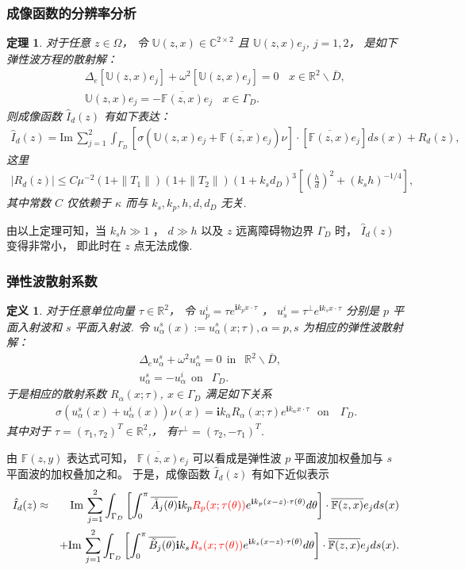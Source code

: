 \documentclass[8pt]{beamer}
\newcommand{\R}{\mathbb{R}}
\renewcommand{\i}{\mathbf{i}}
\renewcommand{\Im}{\mathrm{Im}\,}
\newtheorem{them}{定理}[section]
\newtheorem{deff}{定义}[section]
\newcommand{\om}{\omega}
\newcommand{\al}{\alpha}
\newcommand{\Ga}{\Gamma}
\newcommand{\De}{\Delta}
\newcommand{\bks}{\backslash}
\renewcommand{\i}{\mathbf{i}}
\renewcommand{\C}{{\mathbb{C}}}
\renewcommand{\Im}{\mathrm{Im}\,}
\newcommand{\F}{\mathbb{F}}
\renewcommand{\U}{\mathbb{U}}
\newcommand{\ben}{\begin{eqnarray*}}
\newcommand{\een}{\end{eqnarray*}}
\begin{document}
\begin{frame}
\frametitle{成像函数的分辨率分析}
\begin{them}\label{thm:4.3}
	对于任意 $z\in\Omega$， 令 $\U(z,x)\in\C^{2\times2}$ 且 $\U(z,x)e_j$, $j=1,2$， 是如下弹性波方程的散射解：
	\ben
	& &\Delta_e [\U(z,x)e_j]+ \omega^2[\U(z,x)e_j]= 0 \ \  \ \ x\in\R^2\bks \bar{D},  \\
	& &
	\U(z,x)e_j= -\overline{\F(z,x)}e_j \ \  \ \ x\in\Ga_D.  
	\een
	则成像函数 $\hat{I}_d(z)$ 有如下表达：
	\ben
	\hat{I}_d(z)=\Im\sum_{j=1}^2\int_{\Gamma_D}[\sigma(\U(z,x)e_j+\overline{\F(z,x)}e_j)\nu]\cdot [\overline{\F(z,x)}e_j]ds(x)+R_d(z),\label{id}
	\een
	这里 
	\ben
	|R_d(z)|\leq C\mu^{-2}(1+\|T_1\|)(1+\|T_2\|)(1+k_s d_D)^3\left[\left(\frac hd\right)^{2}+(k_sh)^{-1/4}\right],
	\een
	其中常数 $C$ 仅依赖于 $\kappa$ 而与 $k_s,k_p, h, d, d_D$ 无关.
\end{them}
由以上定理可知，当 $k_s h \gg 1$ ， $d\gg h$ 以及 $z$ 远离障碍物边界 $\Ga_D$ 时， $\hat{I}_d(z)$ 变得非常小， 即此时在 $z$ 点无法成像.
\end{frame}

\begin{frame}
	\frametitle{弹性波散射系数}
	\begin{deff}\label{scarr_con}
		对于任意单位向量 $\tau\in \R^2$， 令 $u^i_p =\tau e^{\i k_p x\cdot \tau}$ ，  $u^i_s= \tau^\perp e^{\i k_s x\cdot \tau}$ 分别是 $p$ 平面入射波和 $s$ 平面入射波.   令 $u^s_\alpha (x) := u^s_\alpha(x;\tau), \al=p,s$ 为相应的弹性波散射解：
		\ben\label{sc1}
		& &\De_e u^s_\alpha + \om^2u^s_\alpha = 0\ \ \mbox{in }   \ \ \R^2\bks\bar{D}, \ \ \ \  \\
		& & u^s_\alpha =-u^i_\alpha \ \ \mbox{on }  \ \ \Ga_D.
		\een
		于是相应的散射系数 $R_\al(x;\tau)$, $x\in\Ga_D$ 满足如下关系
		\ben
		\sigma(u^s_\alpha(x)+u^i_\alpha(x))\nu(x)= \i k_\alpha R_\alpha(x;\tau)e^{\i k_\alpha x\cdot \tau}  \ \ \ \mbox{on } \ \ \  \Ga_D.
		\een
		其中对于 $\tau=(\tau_1,\tau_2)^T\in\R^2$,， 有$\tau^\perp=(\tau_2,-\tau_1)^T$.
	\end{deff}
由 $\F(z,y)$ 表达式可知， $\overline{\F(z,x)}e_j$ 可以看成是弹性波 $p$ 平面波加权叠加与 $s$ 平面波的加权叠加之和。 于是，成像函数 $\hat{I}_d(z)$ 有如下近似表示
\ben
\hat I_d(z)&\approx&\Im\sum^2_{j=1}\int_{\Ga_D}\left[
\int^\pi_0\overline{\tilde A_j(\theta)}\i k_p\textcolor{red}{R_p(x;\tau(\theta))}e^{\i k_p(x-z)\cdot\tau(\theta)}d\theta\right]\cdot\overline{\F(z,x)}e_j ds(x)\\
& &+\Im\sum^2_{j=1}\int_{\Ga_D}\left[
\int^\pi_0\overline{\tilde B_j(\theta)}\i k_s\textcolor{red}{R_s(x;\tau(\theta))}e^{\i k_s(x-z)\cdot\tau(\theta)}d\theta\right]\cdot\overline{\F(z,x)}e_j ds(x).
\een
\end{frame}
\end{document}
